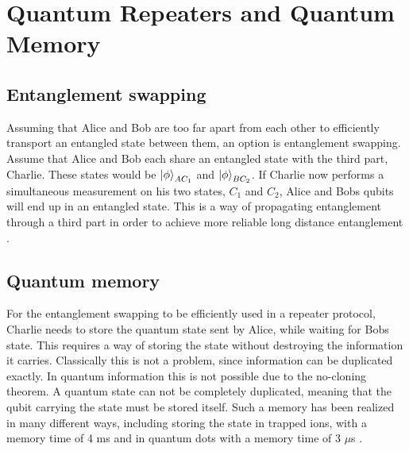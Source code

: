 \section{Quantum Repeaters and Quantum Memory}

\subsection{Entanglement swapping}

Assuming that Alice and Bob are too far apart from each other to efficiently transport an entangled state between them,
an option is entanglement swapping. Assume that Alice and Bob each share an entangled state with the third part, Charlie.
These states would be $\ket{\phi}_{AC_1}$ and $\ket{\phi}_{BC_2}$. If Charlie now performs a simultaneous measurement on his two states, $C_1$ and $C_2$,
Alice and Bobs qubits will end up in an entangled state. This is a way of propagating entanglement through a third part in order to achieve more reliable long distance entanglement \cite{Azuma:2023}.

\subsection{Quantum memory}

For the entanglement swapping to be efficiently used in a repeater protocol, 
Charlie needs to store the quantum state sent by Alice, while waiting for Bobs state. This requires a way of storing the state without destroying the information it carries.
Classically this is not a problem, since information can be duplicated exactly. In quantum information this is not possible due to the no-cloning theorem.
A quantum state can not be completely duplicated, meaning that the qubit carrying the state must be stored itself.
Such a memory has been realized in many different ways, including storing the state in trapped ions, with a memory time of 4 ms \cite{trapped_ion_memory} and in quantum dots with a memory time of 3 $\mu$s \cite{dot_memory}.


